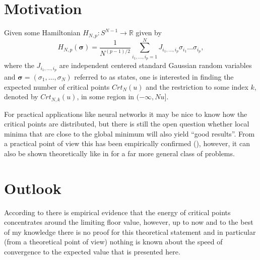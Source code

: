 \section{Motivation}
Given some Hamiltonian $H_{N,p}: S^{N-1}\rightarrow\mathbb R$ given by $$H_{N,p}(\bm\sigma)=\frac{1}{N^{(p-1)/2}}\sum_{i_1,\dots,i_p=1}^N J_{i_1,\dots,i_p}\sigma_{i_1}\dots\sigma_{i_p},$$ where the $J_{i_1,\dots,i_p}$ are independent centered standard Gaussian random variables and $\bm\sigma=(\sigma_1,\dots,\sigma_N)$ referred to as states, one is interested in finding the expected number of critical points $Crt_N(u)$ and the restriction to some index $k$, denoted by $Crt_{N,k}(u)$, in some region in $(-\infty,Nu]$.

For practical applications like neural networks it may be nice to know how the critical points are distributed, but there is still the open question whether local minima that are close to the global minimum will also yield ``good results''. From a practical point of view this has been empirically confirmed (\cite{LeCun2014loss}), however, it can also be shown theoretically like in \cite{loh2013regularized} for a far more general class of problems.

\section{Outlook}
According to \cite{LeCun2014lossvariance} there is empirical evidence that the energy of critical points concentrates around the limiting floor value, however, up to now and to the best of my knowledge there is no proof for this theoretical statement and in particular (from a theoretical point of view) nothing is known about the speed of convergence to the expected value that is presented here.

